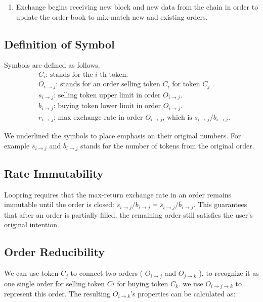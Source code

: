 \documentclass[UTF8,nofonts]{article}
\begin{document}
\begin{enumerate}
  
 \item Exchange begins receiving new block and new data from the chain in order to update the order-book to mix-match new and existing orders.
\end{enumerate}


\subsection{Definition of Symbol}

Symbols are defined as follows.
\[
\begin{split}
&C_{i}\text{: \ }\text{stands for the $i$-th token.}\\
&O_{i\rightarrow j}\text{: \ }\text{stands for an order selling token $C_{i}$ for token $C_{j}$ .}\\
&s_{i\rightarrow j}\text{: \ }\text{selling token upper limit in order $O_{i\rightarrow j}$.}\\
&b_{i\rightarrow j}\text{: \ }\text{buying token lower limit in order $O_{i\rightarrow j}$.}\\
&r_{i\rightarrow j}\text{: \ }\text{max exchange rate in order $O_{i\rightarrow j}$, which is $s_{i\rightarrow j} / b_{i\rightarrow j}$.}
\end{split}
\]


We underlined the symbols to place emphasis on their original numbers. For example $\overline{s}_{i\rightarrow j}$ and $\overline{b}_{i\rightarrow j}$ stands for the number of tokens from the original order.

\subsection{Rate Immutability\label{sec: consistrate}}

Loopring requires that the max-return exchange rate in an order remains immutable until the order is closed: 
$s_{i\rightarrow j} / b_{i\rightarrow j} = \overline{s}_{i\rightarrow j}/ \overline{b}_{i\rightarrow j}$. This guarantees that after an order is partially filled, the remaining order still satisfies the user's original intention.

\subsection{Order Reducibility\label{sec: reducibility}}


We can use token $C_j$ to connect two orders ( $O_{i\rightarrow j}$ and $O_{j\rightarrow k}$ ), to recognize it as one single order for selling token $Ci$ for buying token $C_k$. we use $O_{i\rightarrow j\rightarrow k}$ to represent this order. The resulting $O_{i\rightarrow k}$'s properties can be calculated as: 
\end{document}
